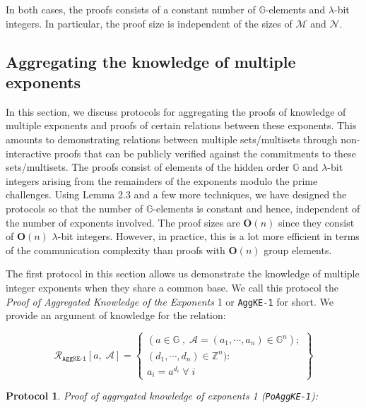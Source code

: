 \documentclass[11pt, lettersize, notitlepage, leqno, footskip=0.6cm]{article}
\newcommand{\bz}{\mathbb Z}
\newcommand{\ttt}{\texttt}
\newcommand{\mc}{\mathcal}
\newcommand{\mb}{\mathbb}
\newcommand{\mbf}{\mathbf}
\newcommand{\lam}{\lambda}
\newcommand{\bO}{\mbf{O}}
\newcommand{\mcM}{\mc{M}}
\newcommand{\vs}{\vspace{-0.15cm}}
\newcommand{\noin}{\noindent}
\newtheorem{Prot}[Thm]{Protocol}
\numberwithin{equation}{section}
\begin{document}
\noin In both cases, the proofs consists of a constant number of $\mb{G}$-elements and $\lam$-bit integers. In particular, the proof size is independent of the sizes of $\mcM$ and $\mc{N}$.




\subsection{\fontsize{11}{11}\selectfont Aggregating the knowledge of multiple exponents}

In this section, we discuss protocols for aggregating the proofs of knowledge of multiple exponents and proofs of certain relations between these exponents. This amounts to demonstrating relations between multiple sets/multisets through non-interactive proofs that can be publicly verified against the commitments to these sets/multisets. The proofs consist of elements of the hidden order $\mb{G}$ and $\lam$-bit integers arising from the remainders of the exponents modulo the prime challenges. Using Lemma 2.3 and a few more techniques, we have designed the protocols so that the number of $\mb{G}$-elements is constant and hence, independent of the number of exponents involved. The proof sizes are $\bO(n)$ since they consist of $\bO(n)$ $\lam$-bit integers. However, in practice, this is a lot more efficient in terms of the communication complexity than proofs with $\bO(n)$ group elements.

The first protocol in this section allows us demonstrate the knowledge of multiple integer exponents when they share a common base. We call this protocol the \textit{Proof of Aggregated Knowledge of the Exponents} 1 or \verb|AggKE-1| for short. We provide an argument of knowledge for the relation: \vs

\[
  \mc{R}_{{\ttt{AggKE-1}}}[a,\; \mc{A}] = \left\{\begin{array}{l}
    (a\in\mb{G}\;,\; \mc{A} = (a_1,\cdots, a_n)\in\mb{G}^n);\\ 
    (d_1,\cdots,d_n)\in\bz^n):  \\
    a_i = a^{d_i}\;\forall\; i
  \end{array}\right\}
\]



\begin{Prot} \normalfont \textit{Proof of aggregated knowledge of exponents} 1 (\verb|PoAggKE-1|):\end{Prot} \vspace{-0.3cm}
\end{document}
